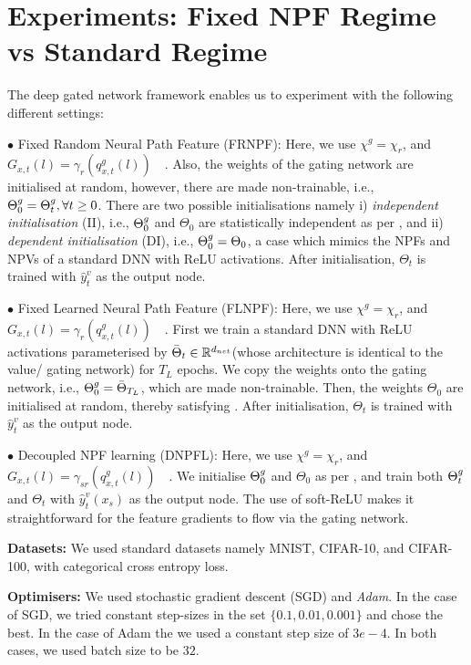 \section{Experiments: Fixed NPF Regime vs  Standard Regime}\label{sec:generalisation}
The deep gated network framework enables us to experiment with the following different settings:

$\bullet$ Fixed Random Neural Path Feature (FRNPF): Here, we use $\chi^g=\chi_r$, and $ G_{x,t}(l)= \gamma_{r}\left(q^g_{x,t}(l)\right)\quad$. Also, the weights of the gating network are initialised at random, however, there are made non-trainable, i.e., ${\Theta}^g_0={\Theta}^g_t,\forall t\geq 0$. There are two possible initialisations namely i) \emph{independent initialisation} (II), i.e., ${\Theta}^g_0$ and $\Theta_0$ are statistically independent as per , and ii) \emph{dependent initialisation} (DI), i.e., ${\Theta}^g_0=\Theta_0$, a case which mimics the NPFs and NPVs of a standard DNN with ReLU activations. After initialisation, $\Theta_t$ is trained with $\hat{y}^v_t$ as the output node.

$\bullet$  Fixed Learned Neural Path Feature (FLNPF): Here, we use $\chi^g=\chi_r$, and $ G_{x,t}(l)= \gamma_{r}\left(q^g_{x,t}(l)\right)\quad$. First we train a standard DNN with ReLU activations parameterised by $\bar{\Theta}_t\in\mathbb{R}^{d_{net}}$(whose architecture is identical to the value/ gating network) for $T_{L}$ epochs. We copy the weights onto the gating network, i.e., ${\Theta}^g_0=\bar{\Theta}_{T_{L}}$, which are made non-trainable. Then, the weights $\Theta_0$ are initialised at random, thereby satisfying . After initialisation, $\Theta_t$ is trained with $\hat{y}^v_t$ as the output node.

$\bullet$ Decoupled NPF learning (DNPFL): Here, we use $\chi^g=\chi_r$, and $ G_{x,t}(l)= \gamma_{sr}\left(q^g_{x,t}(l)\right)\quad$. We initialise ${\Theta}^g_0$ and $\Theta_0$ as per , and train both ${\Theta}^g_t$ and $\Theta_t$ with $\hat{y}^v_t(x_s)$ as the output node. The use of soft-ReLU makes it straightforward for the feature gradients to flow via the gating network.


\textbf{Datasets:} We used standard datasets namely MNIST, CIFAR-10, and CIFAR-100, with categorical cross entropy loss. 

\textbf{Optimisers:} We used stochastic gradient descent (SGD) and \emph{Adam}. In the case of SGD, we tried constant step-sizes in the set $\{0.1,0.01,0.001\}$ and chose the best. In the case of Adam the we used a constant step size of $3e-4$. In both cases, we used batch size to be $32$.

